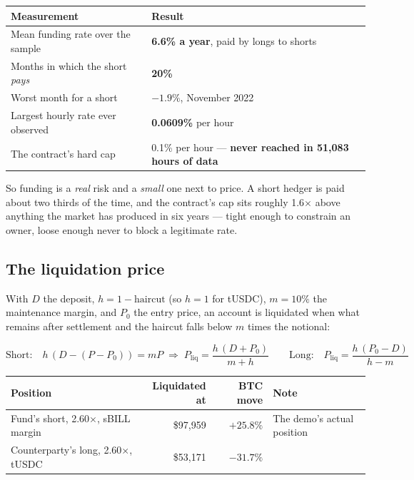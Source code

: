 \documentclass[11pt,a4paper]{article}
\begin{document}
\begin{center}
\small
\begin{tabular}{@{}p{8.2cm}p{7.0cm}@{}}
\toprule
\textbf{Measurement} & \textbf{Result} \\
\midrule
Mean funding rate over the sample & \textbf{6.6\% a year}, paid by longs to shorts \\
Months in which the short \emph{pays} & \textbf{20\%} \\
Worst month for a short & $-1.9\%$, November 2022 \\
Largest hourly rate ever observed & \textbf{0.0609\%} per hour \\
The contract's hard cap & 0.1\% per hour --- \textbf{never reached in 51,083 hours of data} \\
\bottomrule
\end{tabular}
\end{center}

So funding is a \emph{real} risk and a \emph{small} one next to price. A short hedger is paid about
two thirds of the time, and the contract's cap sits roughly 1.6$\times$ above anything the market has
produced in six years — tight enough to constrain an owner, loose enough never to block a legitimate
rate.

\subsection{The liquidation price}\label{sec:liq}

With $D$ the deposit, $h = 1 - \text{haircut}$ (so $h=1$ for tUSDC), $m=10\%$ the maintenance margin,
and $P_0$ the entry price, an account is liquidated when what remains after settlement and the
haircut falls below $m$ times the notional:

\[
\text{Short:}\quad h\,(D - (P-P_0)) = m P \;\Longrightarrow\; P_{\text{liq}} = \frac{h\,(D+P_0)}{m+h}
\qquad
\text{Long:}\quad P_{\text{liq}} = \frac{h\,(P_0-D)}{h-m}
\]

\begin{center}
\small
\begin{tabular}{@{}p{4.4cm}rrp{5.0cm}@{}}
\toprule
\textbf{Position} & \textbf{Liquidated at} & \textbf{BTC move} & \textbf{Note} \\
\midrule
Fund's short, 2.60$\times$, sBILL margin & \$97{,}959 & $+25.8\%$ & The demo's actual position \\
Counterparty's long, 2.60$\times$, tUSDC & \$53{,}171 & $-31.7\%$ & \\
\bottomrule
\end{tabular}
\end{center}
\end{document}

